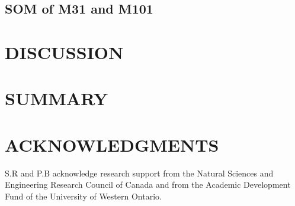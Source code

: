 \documentclass[useAMS,usenatbib]{mn2e}
\begin{document}
   \subsection{SOM of M31 and M101}
\section{DISCUSSION}

\section{SUMMARY}




\section*{ACKNOWLEDGMENTS}
S.R and P.B acknowledge research support from the Natural Sciences and Engineering Research Council of Canada and from the Academic Development Fund of the University of Western Ontario.
\end{document}
